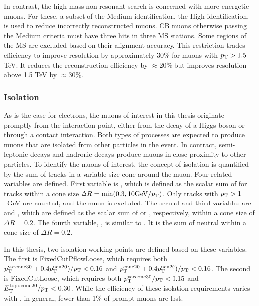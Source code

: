 In contrast, the high-mass non-resonant search is concerned with more energetic muons.
For these, a subset of the Medium identification, the High-\pt identification, is used to reduce incorrectly reconstructed muons.
CB muons otherwise passing the Medium criteria must have three hits in three MS stations.
Some regions of the MS are excluded based on their alignment accuracy.
This restriction trades efficiency to improve \pt resolution by approximately 30\% for muons with $p_\text{T}>1.5$ TeV.
It reduces the reconstruction efficiency by $\approx$20\% but improves \pt resolution above 1.5 TeV by $\approx$30\%.
\cite{muonReco}

\subsubsection{Isolation}

As is the case for electrons, the muons of interest in this thesis originate promptly from the interaction point, either from the decay of a Higgs boson or through a contact interaction.
Both types of processes are expected to produce muons that are isolated from other particles in the event.
In contract, semi-leptonic decays and hadronic decays produce muons in close proximity to other particles.
To identify the muons of interest, the concept of isolation is quantified by the sum of tracks in a variable size cone around the muon.
Four related variables are defined.
First variable is \ptvarconeMuon, which is defined as the scalar sum of \pt for tracks within a cone size $\Delta R=\text{min}(0.3,10\text{GeV}/p_\text{T})$. Only tracks with $p_\text{T}>1$~GeV are counted, and the muon \pt is excluded.
The second and third variables are \etcone and \ptcone, which are defined as the scalar sum of \et or \pt, respectively, within a cone size of $\Delta R=0.2$.
The fourth variable, \neutralcone, is similar to \etcone. It is the sum of neutral \et within a cone size of $\Delta R=0.2$.

In this thesis, two isolation working points are defined based on these variables.
The first is FixedCutPflowLoose, which requires both $p_\text{T}^\text{varcone30}+0.4p_\text{T}^\text{neu20})/p_\text{T}<0.16$ and $p_\text{T}^\text{cone20}+0.4p_\text{T}^\text{neu20})/p_\text{T}<0.16$.
The second is FixedCutLoose, which requires both $p_\text{T}^\text{varcone30}/p_\text{T}<0.15$ and $E_\text{T}^\text{topocone20}/p_\text{T}<0.30$.
While the efficiency of these isolation requirements varies with \pt, in general, fewer than 1\% of prompt muons are lost.
\cite{muonReco}

